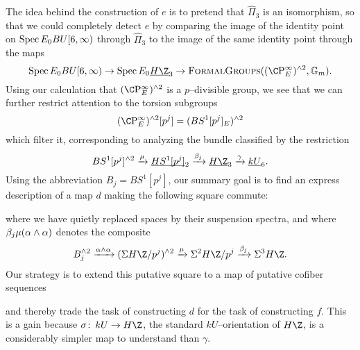 The idea behind the construction of \(e\) is to pretend that \(\widehat \Pi_3\) is an isomorphism, so that we could completely detect \(e\) by comparing the image of the identity point on \(\operatorname{Spec} E_0 BU[6, \infty)\) through \(\widehat \Pi_3\) to the image of the same identity point through the maps \[\Spec E_0 BU[6, \infty) \to \Spec E_0 \OS{H\Z}{3} \to \CatOf{FormalGroups}((\CP^\infty_E)^{\sm 2}, \Gm).\]  Using our calculation that \((\CP^\infty_E)^{\sm 2}\) is a \(p\)--divisible group, we see that we can further restrict attention to the torsion subgroups \[(\CP^\infty_E)^{\sm 2}[p^j] = (BS^1[p^j]_E)^{\sm 2}\] which filter it, corresponding to analyzing the bundle classified by the restriction \[BS^1[p^j]^{\sm 2} \xrightarrow{\mu} \OS{HS^1[p^j]}{2} \xrightarrow{\beta_j} \OS{H\Z}{3} \xrightarrow{\gamma} \OS{kU}{6}.\]  Using the abbreviation \(B_j = BS^1[p^j]\), our summary goal is to find an express description of a map \(d\) making the following square commute:
\begin{center}
\end{center}
where we have quietly replaced spaces by their suspension spectra, and where \(\beta_j \mu(\alpha \wedge \alpha)\) denotes the composite \[B_j^{\sm 2} \xrightarrow{\alpha \sm \alpha} (\Susp H\Z/p^j)^{\sm 2} \xrightarrow{\mu} \Susp^2 H\Z/p^j \xrightarrow{\beta_j} \Susp^3 H\Z.\]  Our strategy is to extend this putative square to a map of putative cofiber sequences
\begin{center}
\end{center}
and thereby trade the task of constructing \(d\) for the task of constructing \(f\).  This is a gain because \(\sigma\co kU \to H\Z\), the standard \(kU\)--orientation of \(H\Z\), is a considerably simpler map to understand than \(\gamma\).

